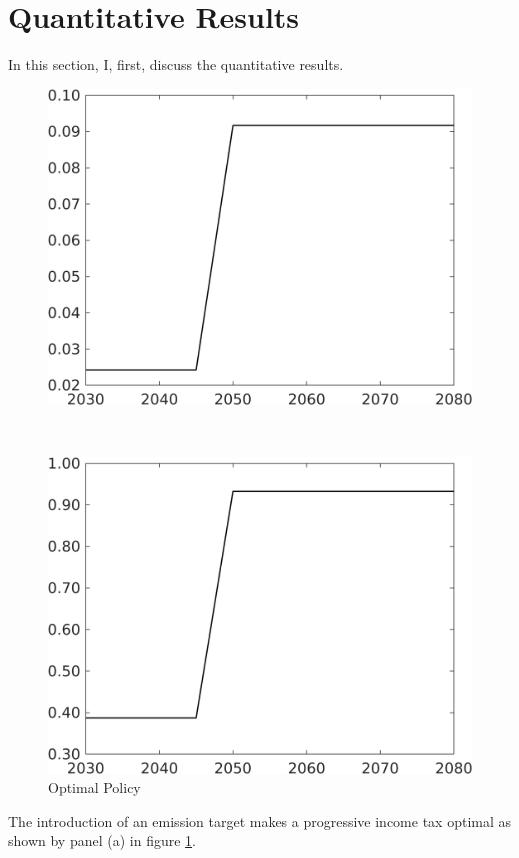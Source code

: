 \section{Quantitative Results}

In this section, I, first, discuss the quantitative results.

\begin{figure}[h!!]
	\centering
	\caption{Optimal Policy }\label{fig:optPol}
	\begin{minipage}[]{0.4\textwidth}
		\includegraphics[width=1\textwidth]{../../codding_model/own_basedOnFried/optimalPol_elastS_DisuSci/figures/all_0505/Single_OPT_T_NoTaus_taul_spillover1_noskill0.png}
	\end{minipage}
\begin{minipage}[]{0.1\textwidth}
\
\end{minipage}
	\begin{minipage}[]{0.4\textwidth}
		\includegraphics[width=1\textwidth]{../../codding_model/own_basedOnFried/optimalPol_elastS_DisuSci/figures/all_0505/Single_OPT_T_NoTaus_tauf_spillover1_noskill0.png}
	\end{minipage}
\end{figure} 

The introduction of an emission target makes a progressive income tax optimal as shown by panel (a) in figure \ref{fig:optPol}. 